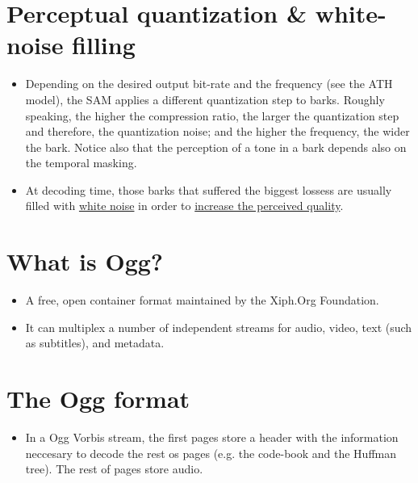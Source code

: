 
\section{Perceptual quantization \& white-noise filling}

\begin{itemize}
\item Depending on the desired output bit-rate and the frequency (see
  the ATH model), the SAM applies a different quantization step to
  barks. Roughly speaking, the higher the compression ratio, the
  larger the quantization step and therefore, the quantization noise;
  and the higher the frequency, the wider the bark. Notice also that
  the perception of a tone in a bark depends also on the temporal
  masking.
\item At decoding time, those barks that suffered the biggest lossess
  are usually filled with
  \href{http://en.wikipedia.org/wiki/White_noise}{white noise} in
  order to \href{http://simplynoise.com/}{increase the perceived
    quality}.
\end{itemize}


\section{What is Ogg?}

\begin{itemize}
\item A free, open container format maintained by the Xiph.Org
  Foundation.
\item It can multiplex a number of independent streams for audio,
  video, text (such as subtitles), and metadata.
\end{itemize}


\section{The Ogg format}


\begin{itemize}
\item In a Ogg Vorbis stream, the first pages store a header with the
  information neccesary to decode the rest os pages (e.g. the
  code-book and the Huffman tree). The rest of pages store audio.
\end{itemize}



